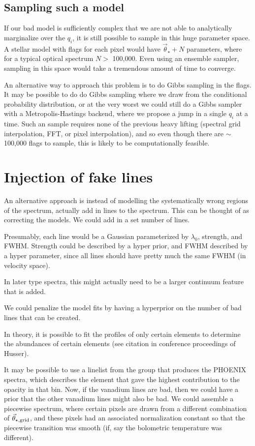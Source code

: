\documentclass[preprint]{aastex} %
\newcommand{\vt}{\vec{\theta}}
\newcommand{\vg}{\vt_{\star, {\rm grid}}}
\newcommand{\vstar}{\vt_{\star}}
\begin{document}
\subsection{Sampling such a model}
If our bad model is sufficiently complex that we are not able to analytically marginalize over the $q_i$, it is still possible to sample in this huge parameter space. A stellar model with flags for each pixel would have $\vstar + N$ parameters, where for a typical optical spectrum $N >$ 100,000. Even using an ensemble sampler, sampling in this space would take a tremendous amount of time to converge. 

An alternative way to approach this problem is to do Gibbs sampling in the flags. It may be possible to do do Gibbs sampling where we draw from the conditional probability distribution, or at the very worst we could still do a Gibbs sampler with a Metropolis-Hastings backend, where we propose a jump in a single $q_i$ at a time. Such an sample requires none of the previous heavy lifting (spectral grid interpolation, FFT, or pixel interpolation), and so even though there are $\sim$ 100,000 flags to sample, this is likely to be computationally feasible.

\section{Injection of fake lines}

An alternative approach is instead of modelling the systematically wrong regions of the spectrum, actually add in lines to the spectrum. This can be thought of as correcting the models. We could add in a set number of lines.

Presumably, each line would be a Gaussian parameterized by $\lambda_0$, strength, and FWHM. Strength could be described by a hyper prior, and FWHM described by a hyper parameter, since all lines should have pretty much the same FWHM (in velocity space). 

In later type spectra, this might actually need to be a larger continuum feature that is added.

We could penalize the model fits by having a hyperprior on the number of bad lines that can be created.

In theory, it is possible to fit the profiles of only certain elements to determine the abundances of certain elements (see citation in conference proceedings of Husser). 

It may be possible to use a linelist from the group that produces the PHOENIX spectra, which describes the element that gave the highest contribution to the opacity in that bin. Now, if the vanadium lines are bad, then we could have a prior that the other vanadium lines might also be bad. We could assemble a piecewise spectrum, where certain pixels are drawn from a different combination of $\vg$, and these pixels had an associated normalization constant so that the piecewise transition was smooth (if, say the bolometric temperature was different). 
\end{document}
